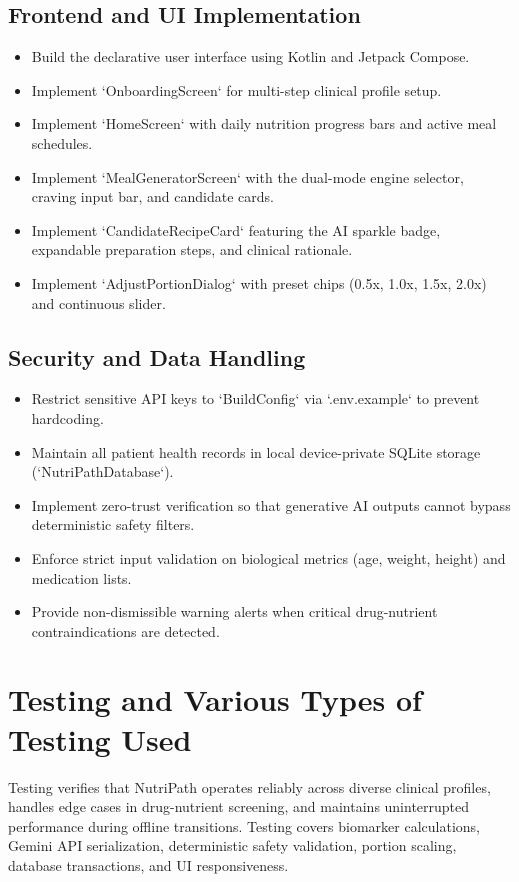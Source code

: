 \documentclass[a4paper,12pt]{report}
\begin{document}
\subsection{Frontend and UI Implementation}
\begin{itemize}
    \item Build the declarative user interface using Kotlin and Jetpack Compose.
    \item Implement `OnboardingScreen` for multi-step clinical profile setup.
    \item Implement `HomeScreen` with daily nutrition progress bars and active meal schedules.
    \item Implement `MealGeneratorScreen` with the dual-mode engine selector, craving input bar, and candidate cards.
    \item Implement `CandidateRecipeCard` featuring the AI sparkle badge, expandable preparation steps, and clinical rationale.
    \item Implement `AdjustPortionDialog` with preset chips (0.5x, 1.0x, 1.5x, 2.0x) and continuous slider.
\end{itemize}

\subsection{Security and Data Handling}
\begin{itemize}
    \item Restrict sensitive API keys to `BuildConfig` via `.env.example` to prevent hardcoding.
    \item Maintain all patient health records in local device-private SQLite storage (`NutriPathDatabase`).
    \item Implement zero-trust verification so that generative AI outputs cannot bypass deterministic safety filters.
    \item Enforce strict input validation on biological metrics (age, weight, height) and medication lists.
    \item Provide non-dismissible warning alerts when critical drug-nutrient contraindications are detected.
\end{itemize}

\section{Testing and Various Types of Testing Used}

Testing verifies that NutriPath operates reliably across diverse clinical profiles, handles edge cases in drug-nutrient screening, and maintains uninterrupted performance during offline transitions. Testing covers biomarker calculations, Gemini API serialization, deterministic safety validation, portion scaling, database transactions, and UI responsiveness.
\end{document}
